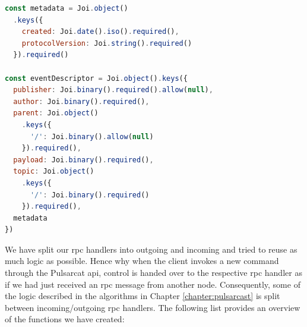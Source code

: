 \begin{lstlisting}[language=JavaScript, float=h, caption={Joi schema for and event descriptor},label={joi-schema-event-descriptor}]
const metadata = Joi.object()
  .keys({
    created: Joi.date().iso().required(),
    protocolVersion: Joi.string().required()
  }).required()

const eventDescriptor = Joi.object().keys({
  publisher: Joi.binary().required().allow(null),
  author: Joi.binary().required(),
  parent: Joi.object()
    .keys({
      '/': Joi.binary().allow(null)
    }).required(),
  payload: Joi.binary().required(),
  topic: Joi.object()
    .keys({
      '/': Joi.binary().required()
    }).required(),
  metadata
})
\end{lstlisting}

We have split our \acrshort{rpc} handlers into outgoing and incoming and tried
to reuse as much logic as possible. Hence why when the client invokes a new
command through the Pulsarcat \acrshort{api}, control is handed over to the
respective \acrshort{rpc} handler as if we had just received an \acrshort{rpc}
message from another node. Consequently, some of the logic described in the
algorithms in Chapter \ref{chapter:pulsarcast} is split between
incoming/outgoing \acrshort{rpc} handlers. The following list provides an
overview of the functions we have created:

